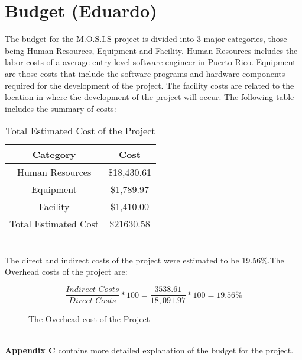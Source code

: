 
 \section{Budget (Eduardo)}
 The budget for the M.O.S.I.S project is divided into 3 major categories, those being Human Resources, Equipment and Facility. Human Resources includes the labor costs of a average entry level software engineer in Puerto Rico\cite{SoftwareEngineerSalary}. Equipment are those costs that include the software programs and hardware components required for the development of the project. The facility costs are related to the location in where the development of the project will occur. The following table includes the summary of costs:
 \begin{table}[h]
    \centering
    \begin{tabular}{||c | c||} 
     \hline
     Category & Cost \\ [0.5ex] 
     \hline\hline
     Human Resources & \$18,430.61\\ 
     \hline
     Equipment & \$1,789.97\\
     \hline
     Facility & \$1,410.00\\
     \hline
     Total Estimated Cost & \$21630.58 \\
     \hline
    \end{tabular}
    \caption {Total Estimated Cost of the Project}
    \label {table:1}
\end{table}
\\ The direct and indirect costs of the project were estimated to be 19.56\%.The Overhead costs of the project are:
\begin{figure}[h]
   $$\frac{\textit{Indirect Costs}}{\textit{Direct Costs}} * 100 = \frac{3538.61}{18,091.97} * 100 = 19.56\%$$
\caption{The Overhead cost of the Project}
\end{figure}
\\\textbf{Appendix C} contains more detailed explanation of the budget for the project.